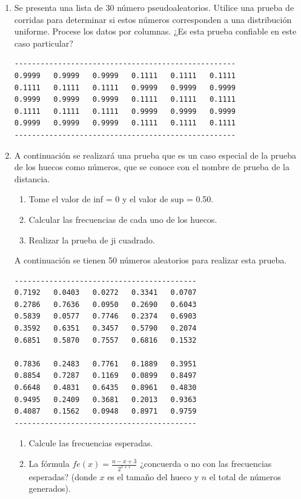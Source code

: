 \begin{enumerate}
\item Se presenta una lista de 30 número pseudoaleatorios. Utilice una prueba de corridas para determinar si estos números corresponden a una distribución uniforme. Procese los datos por columnas. ¿Es esta prueba confiable en este caso particular?
\begin{verbatim}
---------------------------------------------------
0.9999   0.9999   0.9999   0.1111   0.1111   0.1111
0.1111   0.1111   0.1111   0.9999   0.9999   0.9999
0.9999   0.9999   0.9999   0.1111   0.1111   0.1111
0.1111   0.1111   0.1111   0.9999   0.9999   0.9999
0.9999   0.9999   0.9999   0.1111   0.1111   0.1111
---------------------------------------------------
\end{verbatim}

\item A continuación se realizará una prueba que es un caso especial de la prueba de los huecos como números, que se conoce con el nombre de prueba de la distancia.
\begin{enumerate}[label=\Roman*.]
\item Tome el valor de inf = 0 y el valor de sup = 0.50. 
\item Calcular las frecuencias de cada uno de los huecos.
\item Realizar la prueba de ji cuadrado.
\end{enumerate}
A continuación se tienen 50 números aleatorios para realizar esta prueba.
\begin{verbatim}
------------------------------------------
0.7192   0.0403   0.0272   0.3341   0.0707
0.2786   0.7636   0.0950   0.2690   0.6043
0.5839   0.0577   0.7746   0.2374   0.6903
0.3592   0.6351   0.3457   0.5790   0.2074
0.6851   0.5870   0.7557   0.6816   0.1532

0.7836   0.2483   0.7761   0.1889   0.3951
0.8854   0.7287   0.1169   0.0899   0.8497
0.6648   0.4831   0.6435   0.8961   0.4830
0.9495   0.2409   0.3681   0.2013   0.9363
0.4087   0.1562   0.0948   0.8971   0.9759
------------------------------------------
\end{verbatim}

\begin{enumerate}[label=\alph*.]
\item Calcule las frecuencias esperadas.

\item La fórmula $fe(x) = \frac{n-x+3}{2^{x+1}}$ ¿concuerda o no con las frecuencias esperadas? (donde $x$ es el tamaño del hueco y $n$ el total de números generados).


\end{enumerate}
\end{enumerate}
